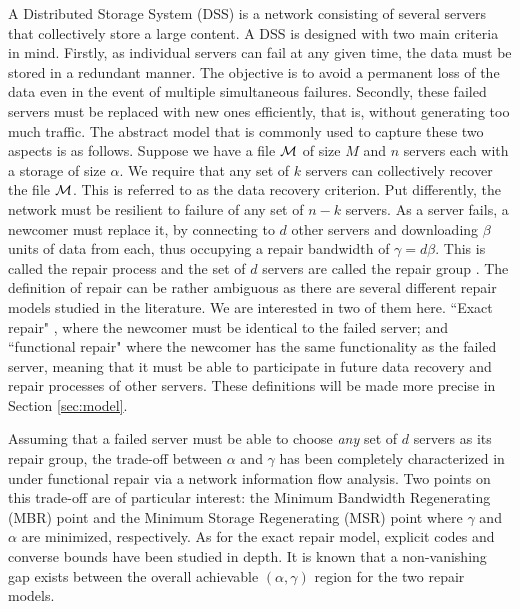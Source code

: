 \documentclass[journal,onecolumn,draftcls]{IEEEtran}
\begin{document}
A Distributed Storage System (DSS) is a network consisting of several servers that collectively store a large content. A DSS is designed with two main criteria in mind. Firstly, as individual servers can fail at any given time, the data must be stored in a redundant manner. The objective is to avoid a permanent loss of the data even in the event of multiple simultaneous failures. Secondly, these failed servers must be replaced with new ones efficiently, that is, without generating too much traffic. The abstract model that is commonly used to capture these two aspects is as follows. Suppose we have a file ${\cal M}$ of size $M$ and $n$ servers each with a storage of size $\alpha$. We require that any set of $k$ servers can collectively recover the file ${\cal M}$. This is referred to as the data recovery criterion. Put differently, the network must be resilient to failure of any set of $n-k$ servers. As a server fails, a newcomer must replace it, by connecting to $d$ other servers and downloading $\beta$ units of data from each, thus occupying a repair bandwidth of $\gamma = d\beta$. This is called the repair process and the set of $d$ servers are called the repair group  \cite{dimakis2010network}. 
The definition of repair can be rather ambiguous as there are several different repair models studied in the literature. We are interested in two of them here. ``Exact repair" \cite{rashmi2009explicit,rashmi2011optimal}, where the newcomer must be identical to the failed server; and ``functional repair" \cite{dimakis2010network} where the newcomer has the same functionality as the failed server, meaning that it must be able to participate in future data recovery and repair processes of other servers. These definitions will be made more precise in Section \ref{sec:model}. 

Assuming that a failed server must be able to choose {\it any} set of $d$ servers as its repair group,  the trade-off between $\alpha$ and $\gamma$ has been completely characterized in \cite{dimakis2010network}  under functional repair via a network information flow analysis. Two points on this trade-off are of particular interest: the Minimum Bandwidth Regenerating (MBR) point and the Minimum Storage Regenerating (MSR) point where $\gamma$ and $\alpha$ are minimized, respectively.   As for the exact repair model, explicit codes \cite{rashmi2009explicit,rashmi2011optimal,shah2012interference,cadambe2013asymptotic,tian2015layered,sasidharan2016explicit}  and converse bounds \cite{sasidharan2014improved,prakash2015storage} have been studied in depth. It is known \cite{tian2013rate} that a non-vanishing gap exists between the overall achievable $(\alpha,\gamma)$  region for the two repair models.
 
\end{document}
